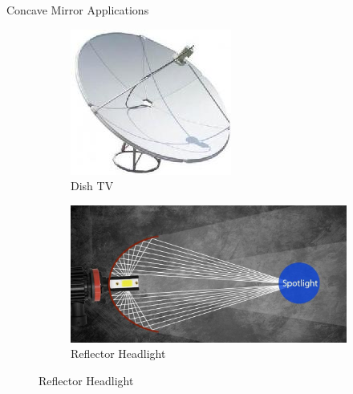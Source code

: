 \documentclass{beamer}
\begin{document}
\begin{frame}{Concave Mirror Applications}
\begin{figure}
\begin{subfigure}[b]{0.3\textwidth}
			\includegraphics[width=\textwidth]{45.jpeg}
			\caption{Dish TV}
			\label{Bending Direction}
		\end{subfigure}
		\hfill
		\begin{subfigure}[b]{0.3\textwidth}
			\centering
			\includegraphics[width=\textwidth]{47.jpeg}
			\caption{Reflector Headlight}
			\label{Bending Direction}
		\end{subfigure}
	\end{figure}
\end{frame}
\end{document}
